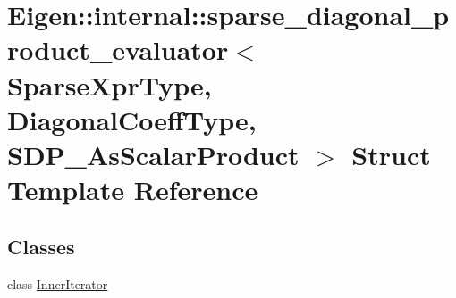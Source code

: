 \hypertarget{struct_eigen_1_1internal_1_1sparse__diagonal__product__evaluator_3_01_sparse_xpr_type_00_01_diag3ebd66799ce02a814119c716700b9642}{}\section{Eigen\+:\+:internal\+:\+:sparse\+\_\+diagonal\+\_\+product\+\_\+evaluator$<$ Sparse\+Xpr\+Type, Diagonal\+Coeff\+Type, S\+D\+P\+\_\+\+As\+Scalar\+Product $>$ Struct Template Reference}
\label{struct_eigen_1_1internal_1_1sparse__diagonal__product__evaluator_3_01_sparse_xpr_type_00_01_diag3ebd66799ce02a814119c716700b9642}
\subsection*{Classes}
\begin{DoxyCompactItemize}
\item 
class \hyperlink{class_eigen_1_1internal_1_1sparse__diagonal__product__evaluator_3_01_sparse_xpr_type_00_01_diagocbb91bd40f7346bf4110a7aa087884f6}{Inner\+Iterator}
\end{DoxyCompactItemize}
